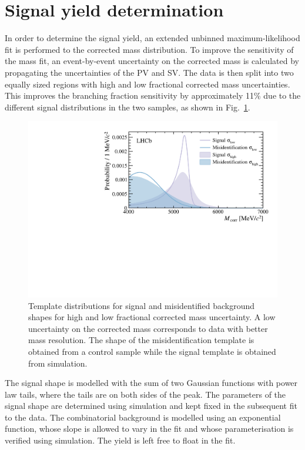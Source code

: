 \section{Signal yield determination}
\label{sec:results}
In order to determine the \Bmumumu signal yield, an extended unbinned maximum-likelihood
fit is performed to the corrected mass distribution. To improve the sensitivity of the mass fit, an event-by-event uncertainty on the corrected mass is calculated by propagating the uncertainties of the PV and SV. The data is then split into two equally sized regions with high and low fractional corrected mass uncertainties. This improves the branching fraction sensitivity by approximately 11\% due to the different signal distributions in the two samples, as shown in Fig.~\ref{fig:resofit}.
\begin{figure}[t]
\centering
	\includegraphics[width=0.85\linewidth]{Figure_3.pdf}
	\caption{\small Template distributions for signal and misidentified background
          shapes for high and low fractional corrected mass
          uncertainty. A low uncertainty on the
          corrected mass corresponds to data with better mass
          resolution. The shape of the misidentification template is
          obtained from a control sample while the signal template is
          obtained from simulation.}
\label{fig:resofit}
\end{figure}

The signal shape is modelled with the sum of two Gaussian functions with power law tails, where the tails are on both sides of the peak. The parameters of the signal shape are determined using simulation and kept fixed in the subsequent fit to the data. The combinatorial background is modelled using an exponential function, whose slope is allowed to vary in the fit and whose parameterisation is verified using simulation. The yield is left free to float in the fit.

